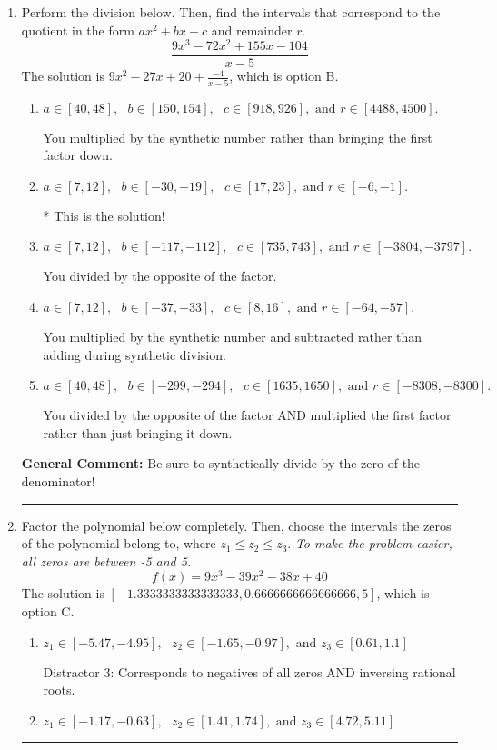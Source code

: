 \documentclass{extbook}[14pt]
\newcommand{\litem}[1]{\item #1

\rule{\textwidth}{0.4pt}}
\begin{document}
\begin{enumerate}\litem{
Perform the division below. Then, find the intervals that correspond to the quotient in the form $ax^2+bx+c$ and remainder $r$.
\[ \frac{9x^{3} -72 x^{2} +155 x -104}{x -5} \]The solution is \( 9x^{2} -27 x + 20 + \frac{-4}{x -5} \), which is option B.\begin{enumerate}[label=\Alph*.]
\item \( a \in [40, 48], \text{   } b \in [150, 154], \text{   } c \in [918, 926], \text{   and   } r \in [4488, 4500]. \)

 You multiplied by the synthetic number rather than bringing the first factor down.
\item \( a \in [7, 12], \text{   } b \in [-30, -19], \text{   } c \in [17, 23], \text{   and   } r \in [-6, -1]. \)

* This is the solution!
\item \( a \in [7, 12], \text{   } b \in [-117, -112], \text{   } c \in [735, 743], \text{   and   } r \in [-3804, -3797]. \)

 You divided by the opposite of the factor.
\item \( a \in [7, 12], \text{   } b \in [-37, -33], \text{   } c \in [8, 16], \text{   and   } r \in [-64, -57]. \)

 You multiplied by the synthetic number and subtracted rather than adding during synthetic division.
\item \( a \in [40, 48], \text{   } b \in [-299, -294], \text{   } c \in [1635, 1650], \text{   and   } r \in [-8308, -8300]. \)

 You divided by the opposite of the factor AND multiplied the first factor rather than just bringing it down.
\end{enumerate}

\textbf{General Comment:} Be sure to synthetically divide by the zero of the denominator!
}
\litem{
Factor the polynomial below completely. Then, choose the intervals the zeros of the polynomial belong to, where $z_1 \leq z_2 \leq z_3$. \textit{To make the problem easier, all zeros are between -5 and 5.}
\[ f(x) = 9x^{3} -39 x^{2} -38 x + 40 \]The solution is \( [-1.3333333333333333, 0.6666666666666666, 5] \), which is option C.\begin{enumerate}[label=\Alph*.]
\item \( z_1 \in [-5.47, -4.95], \text{   }  z_2 \in [-1.65, -0.97], \text{   and   } z_3 \in [0.61, 1.1] \)

 Distractor 3: Corresponds to negatives of all zeros AND inversing rational roots.
\item \( z_1 \in [-1.17, -0.63], \text{   }  z_2 \in [1.41, 1.74], \text{   and   } z_3 \in [4.72, 5.11] \)


\end{enumerate}}
\end{enumerate}
\end{document}
